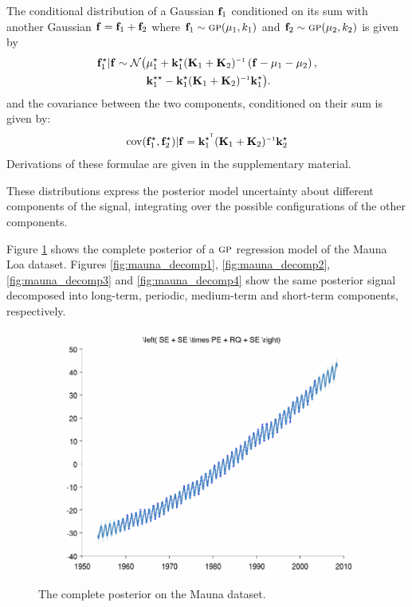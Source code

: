 \documentclass[twoside]{article}
\theoremstyle{definition}
\theoremstyle{remark}
\numberwithin{equation}{section}
\numberwithin{thm}{section}
\begin{document}
The conditional distribution of a Gaussian ${\bf{f}}_1$ conditioned on its sum with another Gaussian ${\bf{f}} = {\bf{f}}_1 + {\bf{f}}_2$ where ${\bf{f}}_1 \sim {\textsc{gp}}( {\bf{\mu}}_1, k_1)$ and ${\bf{f}}_2 \sim {\textsc{gp}}( {\bf{\mu}}_2, k_2)$ is given by
\begin{align}
\vf_1^\star | \vf \sim \mathcal{N} \big( & \vmu_1^\star + \vk_1^\star (\vK_1 + \vK_2)\inv \left( \vf - \vmu_1 - \vmu_2 \right), \nonumber \\
& \vk_1^{\star\star} - \vk_1^\star (\vK_1 + \vK_2)\inv \vk_1^\star \big).
\end{align}
and the covariance between the two components, conditioned on their sum is given by:
\begin{align}
\cov(\vf_1^\star, \vf_2^\star) | \vf = \vk_1^{\star\tra} (\vK_1 + \vK_2)\inv \vk_2^\star
\end{align}
Derivations of these formulae are given in the supplementary material.

These distributions express the posterior model uncertainty about different components of the signal, integrating over the possible configurations of the other components.


Figure \ref{fig:mauna_all} shows the complete posterior of a ${\textsc{gp}}$ regression model of the Mauna Loa dataset.  Figures \ref{fig:mauna_decomp1}, \ref{fig:mauna_decomp2}, \ref{fig:mauna_decomp3} and \ref{fig:mauna_decomp4} show the same posterior signal decomposed into long-term, periodic, medium-term and short-term components, respectively.

\begin{figure}
\includegraphics[width=\columnwidth]{../figures/decomposition/mauna_test_all}
\caption{The complete posterior on the Mauna dataset.}
\label{fig:mauna_all}
\end{figure}
\end{document}
